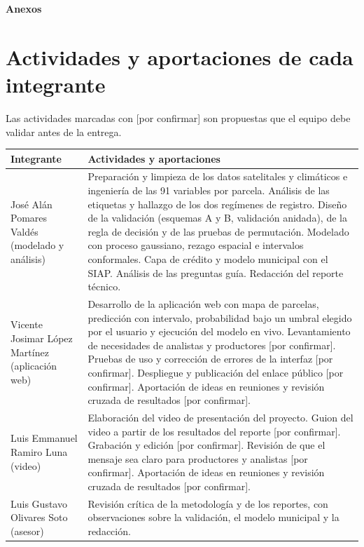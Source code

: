 \documentclass[10pt,letterpaper]{article}
\begin{document}
\begin{center}{\large\bfseries Anexos}\end{center}

\section{Actividades y aportaciones de cada integrante}
Las actividades marcadas con [por confirmar] son propuestas que el equipo debe validar antes de la entrega.

\small
\begin{tabularx}{\textwidth}{@{}>{\raggedright\arraybackslash}p{3.1cm}X@{}}
\toprule
Integrante & Actividades y aportaciones \\
\midrule
José Alán Pomares Valdés (modelado y análisis) &
Preparación y limpieza de los datos satelitales y climáticos e ingeniería de las 91 variables por parcela. Análisis de las etiquetas y hallazgo de los dos regímenes de registro. Diseño de la validación (esquemas A y B, validación anidada), de la regla de decisión y de las pruebas de permutación. Modelado con proceso gaussiano, rezago espacial e intervalos conformales. Capa de crédito y modelo municipal con el SIAP. Análisis de las preguntas guía. Redacción del reporte técnico. \\
\addlinespace
Vicente Josimar López Martínez (aplicación web) &
Desarrollo de la aplicación web con mapa de parcelas, predicción con intervalo, probabilidad bajo un umbral elegido por el usuario y ejecución del modelo en vivo. Levantamiento de necesidades de analistas y productores [por confirmar]. Pruebas de uso y corrección de errores de la interfaz [por confirmar]. Despliegue y publicación del enlace público [por confirmar]. Aportación de ideas en reuniones y revisión cruzada de resultados [por confirmar]. \\
\addlinespace
Luis Emmanuel Ramiro Luna (video) &
Elaboración del video de presentación del proyecto. Guion del video a partir de los resultados del reporte [por confirmar]. Grabación y edición [por confirmar]. Revisión de que el mensaje sea claro para productores y analistas [por confirmar]. Aportación de ideas en reuniones y revisión cruzada de resultados [por confirmar]. \\
\addlinespace
Luis Gustavo Olivares Soto (asesor) &
Revisión crítica de la metodología y de los reportes, con observaciones sobre la validación, el modelo municipal y la redacción. \\
\bottomrule
\end{tabularx}
\normalsize
\end{document}
